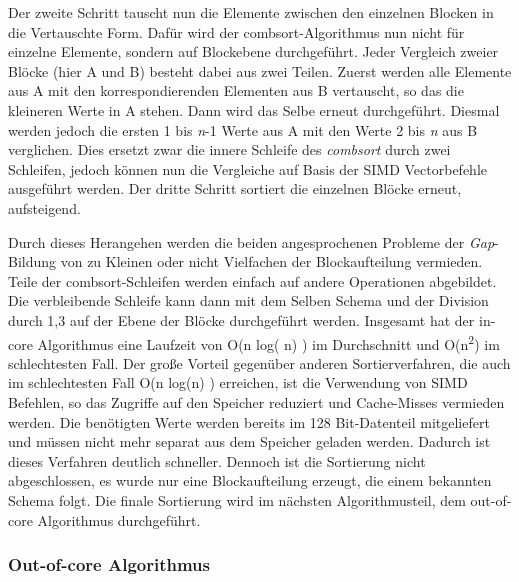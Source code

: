 Der zweite Schritt tauscht nun die Elemente zwischen den einzelnen Blocken in die Vertauschte Form. Dafür wird der combsort-Algorithmus nun nicht für einzelne Elemente, sondern auf Blockebene durchgeführt. Jeder Vergleich zweier Blöcke (hier A und B) besteht dabei aus zwei Teilen. Zuerst werden alle Elemente aus A mit den korrespondierenden Elementen aus B vertauscht, so das die kleineren Werte in A stehen. Dann wird das Selbe erneut durchgeführt. Diesmal werden jedoch die ersten 1 bis \textit{n}-1 Werte aus A mit den Werte 2 bis \textit{n} aus B verglichen. Dies ersetzt zwar die innere Schleife des \textit{combsort} durch zwei Schleifen, jedoch können nun die Vergleiche auf Basis der SIMD Vectorbefehle ausgeführt werden. Der dritte Schritt sortiert die einzelnen Blöcke erneut, aufsteigend.

Durch dieses Herangehen werden die beiden angesprochenen Probleme der \textit{Gap}-Bildung von zu Kleinen oder nicht Vielfachen der Blockaufteilung vermieden. Teile der combsort-Schleifen werden einfach auf andere Operationen abgebildet. Die verbleibende Schleife kann dann mit dem Selben Schema und der Division durch 1,3 auf der Ebene der Blöcke durchgeführt werden. Insgesamt hat der in-core Algorithmus eine Laufzeit von O(n log( n) ) im Durchschnitt und O(n\textsuperscript{2}) im schlechtesten Fall. Der große Vorteil gegenüber anderen Sortierverfahren, die auch im schlechtesten Fall O(n log(n) ) erreichen, ist die Verwendung von SIMD Befehlen, so das Zugriffe auf den Speicher reduziert und Cache-Misses vermieden werden. Die benötigten Werte werden bereits im 128 Bit-Datenteil mitgeliefert und müssen nicht mehr separat aus dem Speicher geladen werden. Dadurch ist dieses Verfahren deutlich schneller. Dennoch ist die Sortierung nicht abgeschlossen, es wurde nur eine Blockaufteilung erzeugt, die einem bekannten Schema folgt. Die finale Sortierung wird im nächsten Algorithmusteil, dem  out-of-core Algorithmus durchgeführt.

\subsubsection*{Out-of-core Algorithmus}
\label{sec:AA-Sort_Out_Of_Core}

